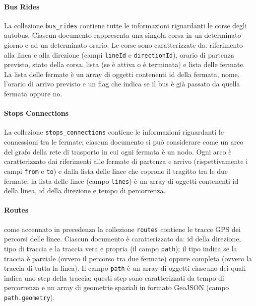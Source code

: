 \paragraph{Bus Rides} La collezione \verb|bus_rides| contiene tutte le informazioni riguardanti le corse degli autobus. Ciascun documento rappresenta una singola corsa in un determinato giorno e ad un determinato orario. Le corse sono caratterizzate da: riferimento alla linea e alla direzione (campi \verb|lineId| e \verb|directionId|), orario di partenza previsto, stato della corsa, lista (se è attiva o è terminata) e lista delle fermate.
La lista delle fermate è un array di oggetti contenenti id della fermata, nome, l'orario di arrivo previsto e un flag che indica se il bus è già passato da quella fermata oppure no.

\paragraph{Stops Connections} La collezione \verb|stops_connections| contiene le informazioni riguardanti le connessioni tra le fermate; ciascun documento si può considerare come un arco del grafo della rete di trasporto in cui ogni fermata è un nodo. Ogni arco è caratterizzato dai riferimenti alle fermate di partenza e arrivo (rispettivamente i campi \verb|from| e \verb|to|) e dalla lista delle linee che coprono il tragitto tra le due fermate; la lista delle linee (campo \verb|lines|) è un array di oggetti contenenti id della linea, id della direzione e tempo di percorrenza.

\paragraph{Routes} come accennato in precedenza la collezione \verb|routes| contiene le tracce GPS dei percorsi delle linee. Ciascun documento è caratterizzato da: id della direzione, tipo di traccia e la traccia vera e propria (il campo \verb|path|); il tipo indica se la traccia è parziale (ovvero il percorso tra due fermate) oppure completa (ovvero la traccia di tutta la linea).
Il campo \verb|path| è un array di oggetti ciascuno dei quali indica uno step della traccia; questi step sono caratterizzati da tempo di percorrenza e un array di geometrie spaziali in formato GeoJSON (campo \verb|path.geometry|).

